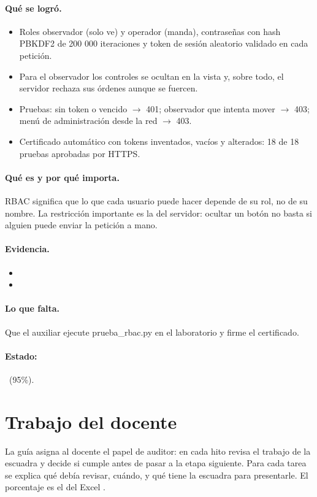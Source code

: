 \documentclass[a4paper,11pt]{article}
\begin{document}
\paragraph{Qué se logró.}
\begin{itemize}
\item Roles observador (solo ve) y operador (manda), contraseñas con hash PBKDF2 de 200 000 iteraciones y token de sesión aleatorio validado en cada petición.
\item Para el observador los controles se ocultan en la vista y, sobre todo, el servidor rechaza sus órdenes aunque se fuercen.
\item Pruebas: sin token o vencido $\to$ 401; observador que intenta mover $\to$ 403; menú de administración desde la red $\to$ 403.
\item Certificado automático  con tokens inventados, vacíos y alterados: 18 de 18 pruebas aprobadas por HTTPS.
\end{itemize}
\paragraph{Qué es y por qué importa.} RBAC significa que lo que cada usuario puede hacer depende de su rol, no de su nombre. La restricción importante es la del servidor: ocultar un botón no basta si alguien puede enviar la petición a mano.
\paragraph{Evidencia.}
\begin{itemize}\small
\item {}
\item {}
\end{itemize}
\paragraph{Lo que falta.} Que el auxiliar ejecute prueba\_rbac.py en el laboratorio y firme el certificado.
\paragraph{Estado:} \parcial~(95\%).
\section{Trabajo del docente}
La guía asigna al docente el papel de auditor: en cada hito revisa el trabajo de la escuadra y decide si cumple antes de pasar a la etapa siguiente. Para cada tarea se explica qué debía revisar, cuándo, y qué tiene la escuadra para presentarle. El porcentaje es el del Excel .
\end{document}
